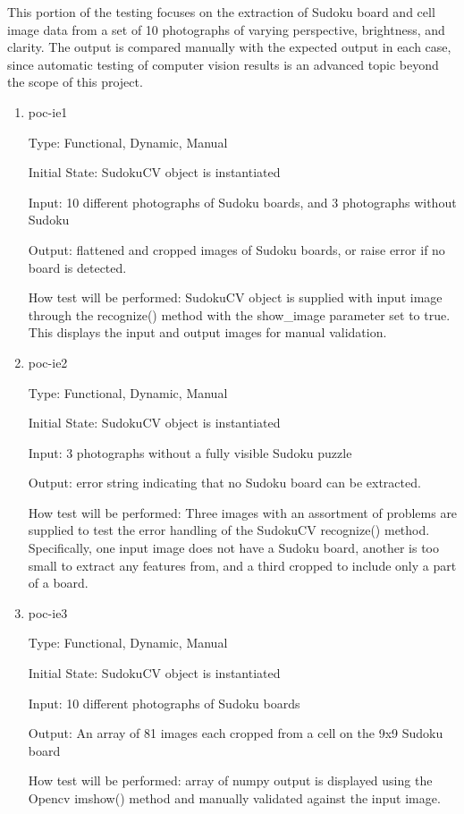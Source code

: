 \documentclass[11pt]{article}
\begin{document}
This portion of the testing focuses on the extraction of Sudoku board and cell image data from a set of 10 photographs of varying perspective, brightness, and clarity. The output is compared manually with the expected output in each case, since automatic testing of computer vision results is an advanced topic beyond the scope of this project.

\begin{enumerate}

\item{poc-ie1\\}

Type: Functional, Dynamic, Manual
					
Initial State: SudokuCV object is instantiated
					
Input: 10 different photographs of Sudoku boards, and 3 photographs without Sudoku
					
Output: flattened and cropped images of Sudoku boards, or raise error if no board is detected.
					
How test will be performed: SudokuCV object is supplied with input image through the recognize() method with the show\_image parameter set to true. This displays the input and output images for manual validation.

\item{poc-ie2\\}

Type: Functional, Dynamic, Manual
					
Initial State: SudokuCV object is instantiated
					
Input: 3 photographs without a fully visible Sudoku puzzle
					
Output: error string indicating that no Sudoku board can be extracted.
					
How test will be performed: Three images with an assortment of problems are supplied to test the error handling of the SudokuCV recognize() method. Specifically, one input image does not have a Sudoku board, another is too small to extract any features from, and a third cropped to include only a part of a board.
					
\item{poc-ie3\\}

Type: Functional, Dynamic, Manual
					
Initial State: SudokuCV object is instantiated
					
Input: 10 different photographs of Sudoku boards
					
Output: An array of 81 images each cropped from a cell on the 9x9 Sudoku board
					
How test will be performed: array of numpy output is displayed using the Opencv imshow() method and manually validated against the input image.

\end{enumerate}
\end{document}
